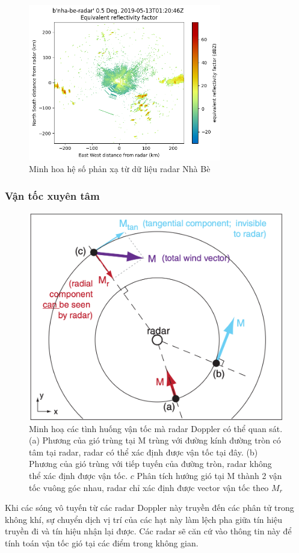 \begin{figure}[H]
    \centering
    \includegraphics[width=0.75\textwidth]{Images/2.1-reflectivity_nhabe.png}
    \vspace{1em}
    \caption{Minh hoa hệ số phản xạ từ dữ liệu radar Nhà Bè}
    \label{fig:reflectivity-nhabe}
\end{figure}


\subsubsection{Vận tốc xuyên tâm}

\begin{figure}[H]
    \centering
    \includegraphics[width=.55\textwidth]{Images/2.1-radial-velocity.png}
    \vspace{2em}
    \caption{Minh hoạ các tình huống vận tốc mà radar Doppler có thể quan sát. (a) Phương của gió trùng tại M trùng với đường kính đường tròn có tâm tại radar, radar có thể xác định được vận tốc tại đây. (b) Phương của gió trùng với tiếp tuyến của đường tròn, radar không thể xác định được vận tốc. \(c\) Phân tích hướng gió tại M thành 2 vận tốc vuông góc nhau, radar chỉ xác định được vector vận tốc theo $M_r$}
    \label{fig:radial-velocity}
\end{figure}

Khi các sóng vô tuyến từ các radar Doppler này truyền đến các phân tử trong không khí, sự chuyển dịch vị trí của các hạt này làm lệch pha giữa tín hiệu truyền đi và tín hiệu nhận lại được. Các radar sẽ căn cứ vào thông tin này để tính toán vận tốc gió tại các điểm trong không gian.